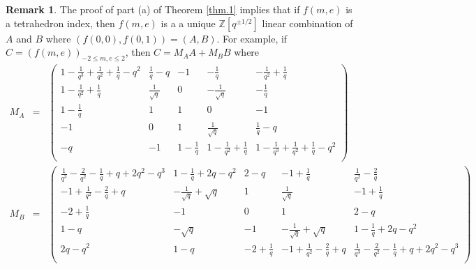 \documentclass[12pt]{amsart}
\theoremstyle{definition}
\newtheorem{remark}[theorem]{Remark}
\def\BZ{\mathbb Z}
\numberwithin{equation}{section}
\begin{document}
\begin{remark}
\label{rem.thm1a}
The proof of part (a) of Theorem \ref{thm.1} implies that if $f(m,e)$
is a tetrahedron index, then $f(m,e)$ is a a unique $\BZ[q^{\pm 1/2}]$ 
linear combination of $A$ and $B$ where $(f(0,0),f(0,1))=(A,B)$.
For example, if $C=(f(m,e))_{-2 \leq m,e \leq 2}$, then 
$C=M_A A + M_B B$ where 
{\tiny
\begin{eqnarray*}
M_A &=& 
\left(
\begin{array}{ccccc}
 1-\frac{1}{q^3}+\frac{1}{q^2}+\frac{1}{q}-q^2 & \frac{1}{q}-q & -1 & -\frac{1}{q} & -\frac{1}{q^2}+\frac{1}{q} \\
 1-\frac{1}{q^2}+\frac{1}{q} & \frac{1}{\sqrt{q}} & 0 & -\frac{1}{\sqrt{q}} & -\frac{1}{q} \\
 1-\frac{1}{q} & 1 & 1 & 0 & -1 \\
 -1 & 0 & 1 & \frac{1}{\sqrt{q}} & \frac{1}{q}-q \\
 -q & -1 & 1-\frac{1}{q} & 1-\frac{1}{q^2}+\frac{1}{q} & 1-\frac{1}{q^3}+\frac{1}{q^2}+\frac{1}{q}-q^2 \\
\end{array}
\right)
\\
M_B &=& 
\left(
\begin{array}{ccccc}
 \frac{1}{q^3}-\frac{2}{q^2}-\frac{1}{q}+q+2 q^2-q^3 & 1-\frac{1}{q}+2 q-q^2 & 2-q & -1+\frac{1}{q} & \frac{1}{q^2}-\frac{2}{q} \\
 -1+\frac{1}{q^2}-\frac{2}{q}+q & -\frac{1}{\sqrt{q}}+\sqrt{q} & 1 & \frac{1}{\sqrt{q}} & -1+\frac{1}{q} \\
 -2+\frac{1}{q} & -1 & 0 & 1 & 2-q \\
 1-q & -\sqrt{q} & -1 & -\frac{1}{\sqrt{q}}+\sqrt{q} & 1-\frac{1}{q}+2 q-q^2 \\
 2 q-q^2 & 1-q & -2+\frac{1}{q} & -1+\frac{1}{q^2}-\frac{2}{q}+q & \frac{1}{q^3}-\frac{2}{q^2}-\frac{1}{q}+q+2 q^2-q^3 \\
\end{array}
\right)
\end{eqnarray*}
}
\end{remark}
\end{document}
